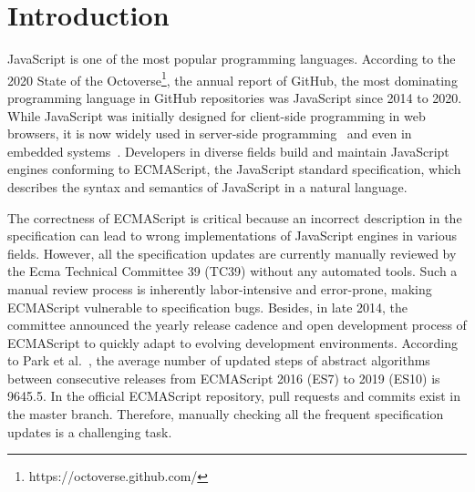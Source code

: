\section{Introduction}\label{sec:intro}

JavaScript is one of the most popular programming languages.  According to the
2020 State of the Octoverse\footnote{https://octoverse.github.com/},
the annual report of GitHub, the most dominating programming language in GitHub
repositories was JavaScript since 2014 to 2020.  While JavaScript was initially
designed for client-side programming in web browsers, it is now widely used in
server-side programming~\cite{nodejs} and even in embedded
systems~\cite{espruino, tessel2, moddable}.  Developers in diverse fields
build and maintain JavaScript engines conforming to ECMAScript, the
JavaScript standard specification, which describes the syntax and semantics of
JavaScript in a natural language.

The correctness of ECMAScript is critical because an incorrect
description in the specification can lead to wrong
implementations of JavaScript engines in various fields.  However,
all the specification updates are currently manually reviewed by the Ecma
Technical Committee 39 (TC39) without any automated tools.
Such a manual review process is inherently labor-intensive and error-prone,
making ECMAScript vulnerable to specification bugs.
Besides, in late 2014, the committee announced the yearly release cadence and open development
process of ECMAScript to quickly adapt to evolving development environments.
According to Park et al.~\cite{jiset}, the average number of updated steps of abstract
algorithms between consecutive releases from ECMAScript 2016 (ES7) to 2019 (ES10) is 9645.5.
In the official ECMAScript repository,  pull
requests and  commits exist in the master branch.
Therefore, manually checking all the frequent specification updates is
a challenging task.

